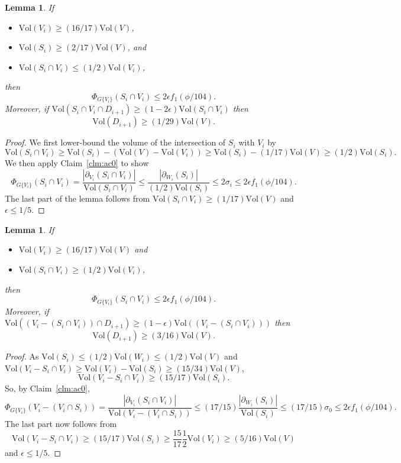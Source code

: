 \documentclass[11pt]{article}
\newtheorem{lemma}[theorem]{Lemma}
\def\bdry#1#2{\partial_{#1}\left(#2\right)}
\def\intersect{\cap}
\def\sizeof#1{\left|#1  \right|}
\def\intersect{\cap}
\def\vol#1{\mathrm{Vol}\left(#1  \right)}
\def\conduc#1#2{\Phi_{#1}\left(#2  \right)}
\begin{document}
\begin{lemma}\label{lem:ac5}
If
\begin{itemize}
\item [(a)] $\vol{V_{i}} \geq (16/17) \vol{V}$,
\item [(b)] $ \vol{S_{i}} \geq (2/17) \vol{V}$, and
\item [(c)] $\vol{S_{i} \intersect V_{i}} \leq (1/2) \vol{V_{i}}$, 
\end{itemize}
 then
\[
\conduc{G \{V_{i}  \} }{S_{i} \intersect V_{i}}
\leq 2 \epsilon f_{1} (\phi /104).
\]
Moreover, if $\vol{S_{i} \intersect V_{i} \intersect D_{i+1}} 
  \geq (1- 2 \epsilon ) \vol{S_{i} \intersect V_{i}}$
then
\[
  \vol{D_{i+1}} \geq (1/29) \vol{V}.
\]
\end{lemma}
\begin{proof}
We first lower-bound the volume of the 
  intersection of $S_{i}$ with $V_{i}$ by
\[
  \vol{S_{i} \intersect V_{i}} \geq \vol{S_{i}} - (\vol{V} - \vol{V_{i}})
  \geq \vol{S_{i}} - (1/17) \vol{V} \geq (1/2) \vol{S_{i}}.
\]
We then apply Claim~\ref{clm:ac0} to show
\[
\conduc{G \{V_{i}  \}}{S_{i} \intersect V_{i}}
=
\frac{
  \sizeof{\bdry{V_{i}}{S_{i} \intersect V_{i}}}
}{
  \vol{S_{i} \intersect V_{i}}
}
\leq 
\frac{
  \sizeof{\bdry{W_{i}}{S_{i}}}
}{
  (1/2) \vol{S_{i}}
}
\leq 2 \sigma_{i}
\leq 2 \epsilon f_{1} (\phi /104).
\]
The last part of the lemma follows from 
  $\vol{S_{i} \intersect V_{i}} \geq (1/17) \vol{V}$ 
  and $\epsilon \leq 1/5$.  
\end{proof}

\begin{lemma}\label{lem:ac6}
If
\begin{itemize}
\item [(a)] $\vol{V_{i}} \geq (16/17) \vol{V}$  and
\item [(b)] $\vol{S_{i} \intersect V_{i}} \geq (1/2) \vol{V_{i}}$,
\end{itemize}
 then
\[
\conduc{G \{V_{i}  \}}{S_{i} \intersect V_{i}}
\leq 2 \epsilon f_{1} (\phi /104).
\]
Moreover, if $\vol{(V_{i} - (S_{i} \intersect V_{i})) \intersect D_{i+1}} 
  \geq (1-\epsilon ) \vol{(V_{i} - (S_{i} \intersect V_{i}))}$
then
\[
  \vol{D_{i+1}} \geq (3/16) \vol{V}.
\]
\end{lemma}
\begin{proof}
As 
  $\vol{S_{i}} \leq (1/2) \vol{W_{i}} \leq (1/2) \vol{V}$ and
 $\vol{V_{i} - S_{i} \intersect V_{i}}
  \geq \vol{V_{i}} - \vol{S_{i}} 
  \geq (15/34) \vol{V}$,
\[
  \vol{V_{i} - S_{i} \intersect V_{i}} \geq (15/17) \vol{S_{i}}.
\]
So, by Claim~\ref{clm:ac0},
\[
 \conduc{G \{V_{i} \}}{V_{i} - (V_{i} \intersect S_{i})} 
=
\frac{
 \sizeof{\bdry{V_{i}}{S_{i} \intersect V_{i}}}
}{
  \vol{V_{i} - (V_{i} \intersect S_{i})}
}
\leq 
(17/15)
\frac{
  \sizeof{\bdry{W_{i}}{S_{i}}}
}{
  \vol{S_{i}}
}
\leq
(17/15) \sigma_{0}
\leq 
2 \epsilon f_{1} (\phi /104).
\]
The last part now follows from
\[
  \vol{V_{i} - S_{i} \intersect V_{i}} \geq (15/17) \vol{S_{i}}
 \geq \frac{15}{17} \frac{1}{2} \vol{V_{i}} \geq (5/16) \vol{V}
\]
and $\epsilon \leq 1/5$.
\end{proof}
\end{document}

